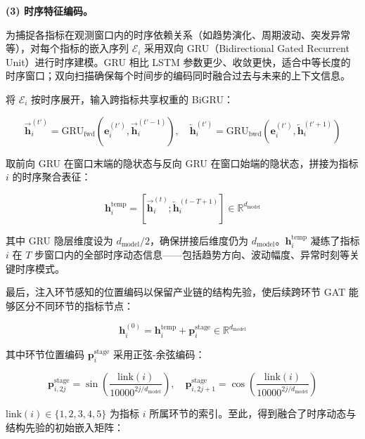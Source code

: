 \textbf{(3) 时序特征编码。}

为捕捉各指标在观测窗口内的时序依赖关系（如趋势演化、周期波动、突发异常等），对每个指标的嵌入序列 $\mathcal{E}_i$ 采用双向 GRU（Bidirectional Gated Recurrent Unit）进行时序建模。GRU 相比 LSTM 参数更少、收敛更快，适合中等长度的时序窗口；双向扫描确保每个时间步的编码同时融合过去与未来的上下文信息。

将 $\mathcal{E}_i$ 按时序展开，输入跨指标共享权重的 BiGRU：

\begin{equation}
\overrightarrow{\mathbf{h}}_i^{(t')} = \text{GRU}_{\text{fwd}}\left(\mathbf{e}_i^{(t')}, \overrightarrow{\mathbf{h}}_i^{(t'-1)}\right), \quad
\overleftarrow{\mathbf{h}}_i^{(t')} = \text{GRU}_{\text{bwd}}\left(\mathbf{e}_i^{(t')}, \overleftarrow{\mathbf{h}}_i^{(t'+1)}\right)
\end{equation}

取前向 GRU 在窗口末端的隐状态与反向 GRU 在窗口始端的隐状态，拼接为指标 $i$ 的时序聚合表征：

\begin{equation}
\mathbf{h}_i^{\text{temp}} = \left[\overrightarrow{\mathbf{h}}_i^{(t)}; \overleftarrow{\mathbf{h}}_i^{(t-T+1)}\right] \in \mathbb{R}^{d_{\text{model}}}
\end{equation}

其中 GRU 隐层维度设为 $d_{\text{model}}/2$，确保拼接后维度仍为 $d_{\text{model}}$。$\mathbf{h}_i^{\text{temp}}$ 凝练了指标 $i$ 在 $T$ 步窗口内的全部时序动态信息——包括趋势方向、波动幅度、异常时刻等关键时序模式。

最后，注入环节感知的位置编码以保留产业链的结构先验，使后续跨环节 GAT 能够区分不同环节的指标节点：

\begin{equation}
\mathbf{h}_i^{(0)} = \mathbf{h}_i^{\text{temp}} + \mathbf{p}_i^{\text{stage}} \in \mathbb{R}^{d_{\text{model}}}
\end{equation}

其中环节位置编码 $\mathbf{p}_i^{\text{stage}}$ 采用正弦-余弦编码：

\begin{equation}
\mathbf{p}_{i,2j}^{\text{stage}} = \sin\left(\frac{\text{link}(i)}{10000^{2j/d_{\text{model}}}}\right), \quad
\mathbf{p}_{i,2j+1}^{\text{stage}} = \cos\left(\frac{\text{link}(i)}{10000^{2j/d_{\text{model}}}}\right)
\end{equation}

$\text{link}(i)\in\{1,2,3,4,5\}$ 为指标 $i$ 所属环节的索引。至此，得到融合了时序动态与结构先验的初始嵌入矩阵：

